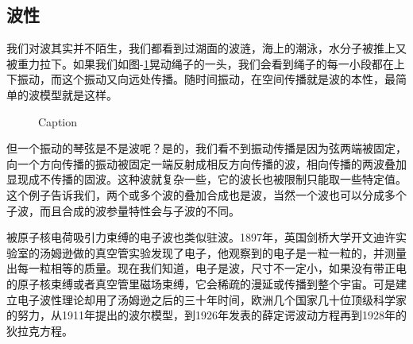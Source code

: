 \documentclass{ctexbook}
\begin{document}
\subsection{波性}
我们对波其实并不陌生，我们都看到过湖面的波涟，海上的潮泳，水分子被推上又被重力拉下。如果我们如图-\ref{string}晃动绳子的一头，我们会看到绳子的每一小段都在上下振动，而这个振动又向远处传播。随时间振动，在空间传播就是波的本性，最简单的波模型就是这样。
\begin{figure}\label{string}
    \centering
{}

    \caption{Caption}
\end{figure}

但一个振动的琴弦是不是波呢？是的，我们看不到振动传播是因为弦两端被固定，向一个方向传播的振动被固定一端反射成相反方向传播的波，相向传播的两波叠加显现成不传播的固波。这种波就复杂一些，它的波长也被限制只能取一些特定值。这个例子告诉我们，两个或多个波的叠加合成也是波，当然一个波也可以分成多个子波，而且合成的波参量特性会与子波的不同。

被原子核电荷吸引力束缚的电子波也类似驻波。1897年，英国剑桥大学开文迪许实验室的汤姆逊做的真空管实验发现了电子，他观察到的电子是一粒一粒的，并测量出每一粒相等的质量。现在我们知道，电子是波，尺寸不一定小，如果没有带正电的原子核束缚或者真空管里磁场束缚，它会稀疏的漫延或传播到整个宇宙。可是建立电子波性理论却用了汤姆逊之后的三十年时间，欧洲几个国家几十位顶级科学家的努力，从1911年提出的波尔模型，到1926年发表的薛定谔波动方程再到1928年的狄拉克方程。
\end{document}
